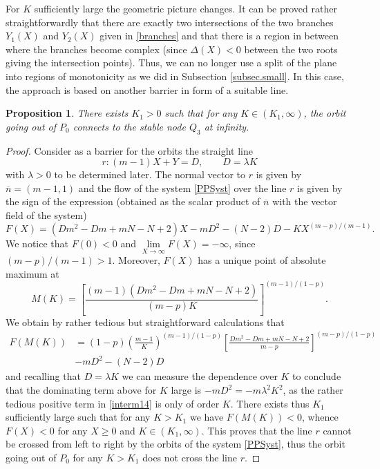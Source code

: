 \documentclass[a4paper,11pt]{article}
\newtheorem{proposition}[theorem]{Proposition}
\numberwithin{equation}{section}
\begin{document}
For $K$ sufficiently large the geometric picture changes. It can be proved rather straightforwardly that there are exactly two intersections of the two branches $Y_1(X)$ and $Y_2(X)$ given in \eqref{branches} and that there is a region in between where the branches become complex (since $\Delta(X)<0$ between the two roots giving the intersection points). Thus, we can no longer use a split of the plane into regions of monotonicity as we did in Subsection \ref{subsec.small}. In this case, the approach is based on another barrier in form of a suitable line.
\begin{proposition}\label{prop.large}
There exists $K_1>0$ such that for any $K\in(K_1,\infty)$, the orbit going out of $P_0$ connects to the stable node $Q_3$ at infinity.
\end{proposition}
\begin{proof}
Consider as a barrier for the orbits the straight line
\begin{equation}\label{interm13}
r: (m-1)X+Y=D, \qquad D=\lambda K
\end{equation}
with $\lambda>0$ to be determined later. The normal vector to $r$ is given by $\overline{n}=(m-1,1)$ and the flow of the system \eqref{PPSyst} over the line $r$ is given by the sign of the expression (obtained as the scalar product of $\overline{n}$ with the vector field of the system)
$$
F(X)=(Dm^2-Dm+mN-N+2)X-mD^2-(N-2)D-KX^{(m-p)/(m-1)}.
$$
We notice that $F(0)<0$ and $\lim\limits_{X\to\infty}F(X)=-\infty$, since $(m-p)/(m-1)>1$. Moreover, $F(X)$ has a unique point of absolute maximum at
$$
M(K)=\left[\frac{(m-1)(Dm^2-Dm+mN-N+2)}{(m-p)K}\right]^{(m-1)/(1-p)}.
$$
We obtain by rather tedious but straightforward calculations that
\begin{equation}\label{interm14}
\begin{split}
F(M(K))&=(1-p)\left(\frac{m-1}{K}\right)^{(m-1)/(1-p)}\left[\frac{Dm^2-Dm+mN-N+2}{m-p}\right]^{(m-p)/(1-p)}\\
&-mD^2-(N-2)D
\end{split}
\end{equation}
and recalling that $D=\lambda K$ we can measure the dependence over $K$ to conclude that the dominating term above for $K$ large is $-mD^2=-m\lambda^2K^2$, as the rather tedious positive term in \eqref{interm14} is only of order $K$. There exists thus $K_1$ sufficiently large such that for any $K>K_1$ we have $F(M(K))<0$, whence $F(X)<0$ for any $X\geq0$ and $K\in(K_1,\infty)$. This proves that the line $r$ cannot be crossed from left to right by the orbits of the system \eqref{PPSyst}, thus the orbit going out of $P_0$ for any $K>K_1$ does not cross the line $r$.


\end{proof}
\end{document}
